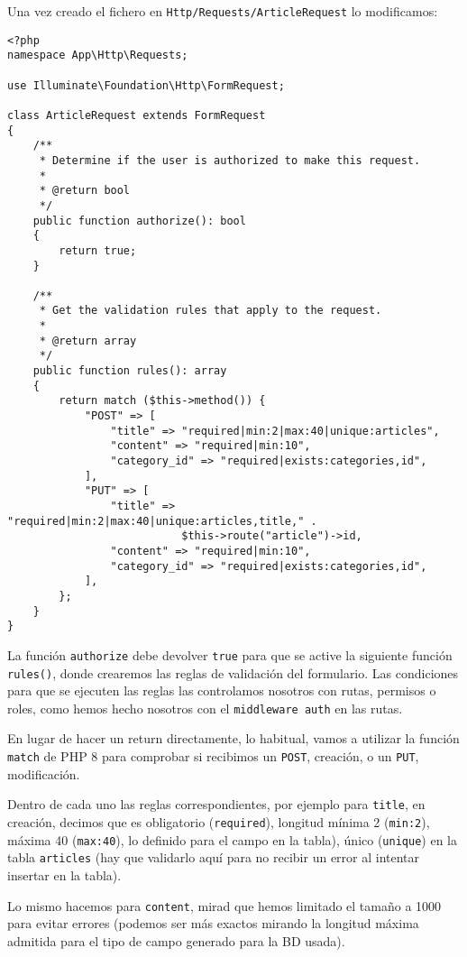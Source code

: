 \documentclass[11pt]{article}
\begin{document}
Una vez creado el fichero en \texttt{Http/Requests/ArticleRequest} lo modificamos:
\begin{verbatim}
<?php
namespace App\Http\Requests;

use Illuminate\Foundation\Http\FormRequest;

class ArticleRequest extends FormRequest
{
    /**
     * Determine if the user is authorized to make this request.
     *
     * @return bool
     */
    public function authorize(): bool
    {
        return true;
    }

    /**
     * Get the validation rules that apply to the request.
     *
     * @return array
     */
    public function rules(): array
    {
        return match ($this->method()) {
            "POST" => [
                "title" => "required|min:2|max:40|unique:articles",
                "content" => "required|min:10",
                "category_id" => "required|exists:categories,id",
            ],
            "PUT" => [
                "title" => "required|min:2|max:40|unique:articles,title," .
                           $this->route("article")->id,
                "content" => "required|min:10",
                "category_id" => "required|exists:categories,id",
            ],
        };
    }
}
\end{verbatim}

La función \texttt{authorize} debe devolver \texttt{true} para que se active la
siguiente función \texttt{rules()}, donde crearemos las reglas de validación
del formulario. Las condiciones para que se ejecuten las reglas las
controlamos nosotros con rutas, permisos o roles, como hemos hecho
nosotros con el \texttt{middleware auth} en las rutas.

En lugar de hacer un return directamente, lo habitual, vamos a
utilizar la función \texttt{match} de PHP 8 para comprobar si recibimos un
\texttt{POST}, creación, o un \texttt{PUT}, modificación.

Dentro de cada uno las reglas correspondientes, por ejemplo para
\texttt{title}, en creación, decimos que es obligatorio (\texttt{required}),
longitud mínima 2 (\texttt{min:2}), máxima 40 (\texttt{max:40}), lo definido para el
campo en la tabla), único (\texttt{unique}) en la tabla \texttt{articles} (hay que
validarlo aquí para no recibir un error al intentar insertar en la
tabla).

Lo mismo hacemos para \texttt{content}, mirad que hemos limitado el tamaño a
1000 para evitar errores (podemos ser más exactos mirando la longitud
máxima admitida para el tipo de campo generado para la BD usada).
\end{document}
